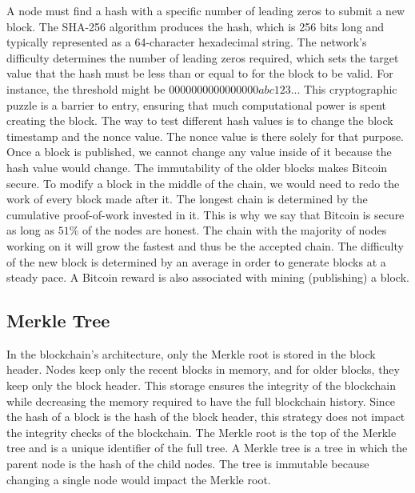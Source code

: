 A node must find a hash with a specific number of leading zeros to submit a new block.
The SHA-256 algorithm produces the hash, which is 256 bits long and typically represented as a 64-character hexadecimal string. 
The network's difficulty determines the number of leading zeros required, which sets the target value that the hash must be less than or equal to for the block to be valid.
For instance, the threshold might be $0000000000000000abc123...$
This cryptographic puzzle is a barrier to entry, ensuring that much computational power is spent creating the block.
The way to test different hash values is to change the block timestamp and the nonce value.
The nonce value is there solely for that purpose. Once a block is published, we cannot change any value inside of it because the hash value would change.
The immutability of the older blocks makes Bitcoin secure. To modify a block in the middle of the chain, we would need to redo the work of every block made after it.
The longest chain is determined by the cumulative proof-of-work invested in it. This is why we say that Bitcoin is secure as long as $51\%$ of the nodes are honest.
The chain with the majority of nodes working on it will grow the fastest and thus be the accepted chain.
The difficulty of the new block is determined by an average in order to generate blocks at a steady pace. A Bitcoin reward is also associated with mining (publishing) a block.


\subsection{Merkle Tree}
In the blockchain's architecture, only the Merkle root is stored in the block header. Nodes keep only the recent blocks in memory, and for older blocks, they keep only the block header.
This storage ensures the integrity of the blockchain while decreasing the memory required to have the full blockchain history.
Since the hash of a block is the hash of the block header, this strategy does not impact the integrity checks of the blockchain.
The Merkle root is the top of the Merkle tree and is a unique identifier of the full tree. A Merkle tree is a tree in which the parent node is the hash of the child nodes.
The tree is immutable because changing a single node would impact the Merkle root.


